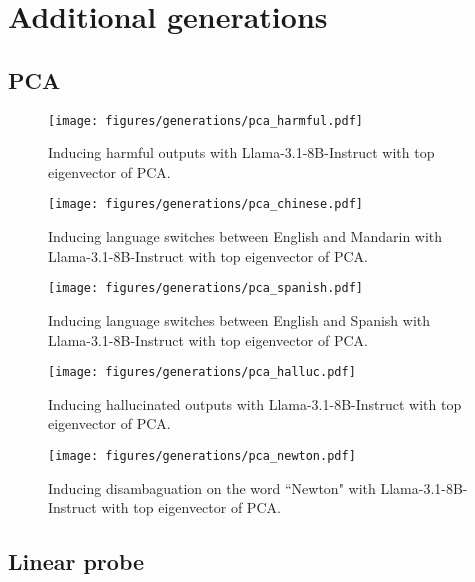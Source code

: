 \section{Additional generations}

\subsection{PCA}

\begin{figure}[h]
    \centering
    \texttt{[image: figures/generations/pca\_harmful.pdf]}
    \caption{Inducing harmful outputs with Llama-3.1-8B-Instruct with top eigenvector of PCA.}
    \label{fig: pca_harmful, llama-3.1-8B}
\end{figure}

\begin{figure}[h]
    \centering
    \texttt{[image: figures/generations/pca\_chinese.pdf]}
    \caption{Inducing language switches between English and Mandarin with Llama-3.1-8B-Instruct with top eigenvector of PCA.}
    \label{fig: pca_chinese, llama-3.1-8B}
\end{figure}

\begin{figure}[h]
    \centering
    \texttt{[image: figures/generations/pca\_spanish.pdf]}
    \caption{Inducing language switches between English and Spanish with Llama-3.1-8B-Instruct with top eigenvector of PCA.}
    \label{fig: pca_spanish, llama-3.1-8B}
\end{figure}

\begin{figure}[h]
    \centering
    \texttt{[image: figures/generations/pca\_halluc.pdf]}
    \caption{Inducing hallucinated outputs with Llama-3.1-8B-Instruct with top eigenvector of PCA.}
    \label{fig: pca_halluc, llama-3.1-8B}
\end{figure}

\begin{figure}[h]
    \centering
    \texttt{[image: figures/generations/pca\_newton.pdf]}
    \caption{Inducing disambaguation on the word ``Newton" with Llama-3.1-8B-Instruct with top eigenvector of PCA.}
    \label{fig: pca_newton, llama-3.1-8B}
\end{figure}

\clearpage
\subsection{Linear probe}

